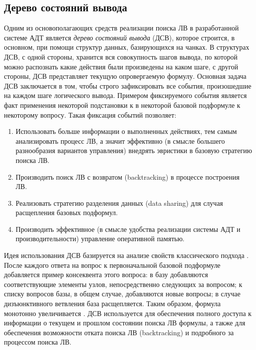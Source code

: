 \subsection{Дерево состояний вывода}
Одним из основополагающих средств реализации поиска ЛВ в разработанной системе АДТ является \emph{дерево состояний вывода} (ДСВ), которое строится, в основном, при помощи структур данных, базирующихся на чанках. В структурах ДСВ, с одной стороны, хранится вся совокупность шагов вывода, по которой можно распознать какие действия были произведены на каком шаге, с другой стороны, ДСВ представляет текущую опровергаемую формулу. Основная задача ДСВ заключается в том, чтобы строго зафиксировать все события, произошедшие на каждом шаге логического вывода. Примером фиксируемого события является факт применения некоторой подстановки к в некоторой базовой подформуле к некоторому вопросу. Такая фиксация событий позволяет:
\begin{enumerate}
 \item Использовать больше информации о выполненных действиях, тем самым анализировать процесс ЛВ, а значит эффективно (в смысле большего разнообразия вариантов управления) внедрять эвристики в базовую стратегию поиска ЛВ.
 \item Производить поиск ЛВ с возвратом (backtracking) в процессе построения ЛВ.
 \item Реализовать стратегию разделения данных (data sharing) для случая расщепления базовых подформул.
 \item Производить эффективное (в смысле удобства реализации системы АДТ и производительности) управление оперативной памятью.
\end{enumerate}

Идея использования ДСВ базируется на анализе свойств классического подхода . После каждого ответа на вопрос к первоначальной базовой подформуле добавляется пример консеквента этого вопроса: в базу добавляются соответствующие элементы узлов, непосредственно следующих за вопросом; к списку вопросов базы, в общем случае, добавляются новые вопросы; в случае дизъюнктивного ветвления база расщепляется. Таким образом, формула монотонно увеличивается . ДСВ используется для обеспечения полного доступа к информации о текущем и прошлом состоянии поиска ЛВ формулы, а также для обеспечения возможности отката поиска ЛВ (backtracking) и подробного  за процессом поиска ЛВ.

